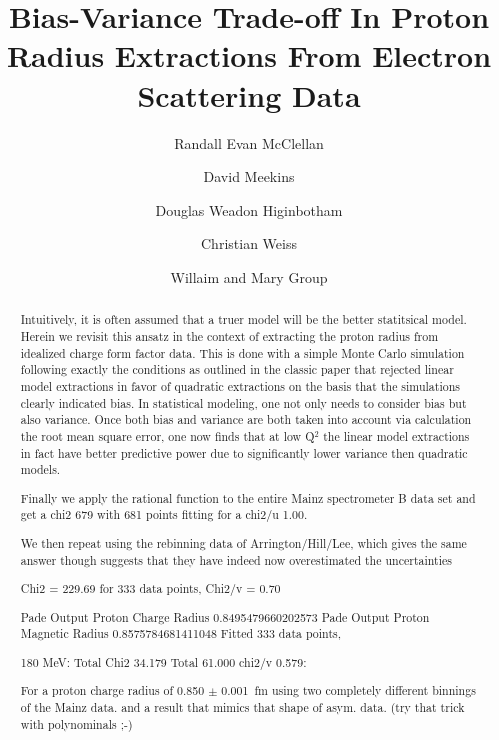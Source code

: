 \documentclass[10pt,aps,prc,twocolumn]{revtex4-1}
\begin{document}
\title{Bias-Variance Trade-off In Proton Radius Extractions From Electron Scattering Data}

\author{Randall Evan McClellan}
\author{David Meekins} 
\author{Douglas Weadon Higinbotham}
\author{Christian Weiss}
\author{Willaim and Mary Group}

\begin{abstract}
Intuitively, it is often assumed that a truer model will be the better statitsical model.
Herein we revisit this ansatz in the context of extracting the proton radius from idealized
charge form factor data.
This is done with a simple Monte Carlo simulation following exactly the conditions as outlined
in the classic paper that rejected linear model extractions in favor of quadratic extractions
on the basis that the simulations clearly indicated bias.   In statistical modeling,
one not only needs to consider bias but also variance.
Once both bias and variance are both taken into account via calculation the root mean square error, 
one now finds that at low Q$^2$ the linear model extractions in fact have better predictive 
power due to significantly lower variance then quadratic models.

Finally we apply the rational function to the entire Mainz spectrometer B data set and get a
chi2 679 with 681 points fitting for a chi2/u  1.00.   

We then repeat using the rebinning data of Arrington/Hill/Lee, which gives the same answer though
suggests that they have indeed now overestimated the uncertainties

Chi2 = 229.69 for 333 data points, Chi2/v = 0.70 

Pade Output Proton Charge Radius 0.8495479660202573
Pade Output Proton Magnetic Radius 0.8575784681411048
Fitted 333 data points,

180 MeV: Total Chi2 34.179 Total 61.000 chi2/v 0.579:

For a proton charge radius of 0.850 $\pm$ 0.001~fm using two completely different binnings of the Mainz data.
and a result that mimics that shape of asym. data.
(try that trick with polynominals ;-)

\end{abstract}
\end{document}
